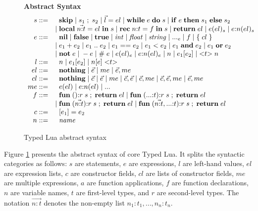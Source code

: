 \begin{figure}[!ht]
\textbf{Abstract Syntax}\\
\dstart
$$
\begin{array}{rl}
s ::= & \;\; \mathbf{skip} \; | \;
s_{1} \; ; \; s_{2} \; | \;
\vec{l} = el \; | \;
\mathbf{while} \; e \; \mathbf{do} \; s \; | \;
\mathbf{if} \; e \; \mathbf{then} \; s_{1} \; \mathbf{else} \; s_{2}\\
& | \; \mathbf{local} \; \vec{n{:}t} = el \; \mathbf{in} \; s \; | \;
\mathbf{rec} \; n{:}t = f \; \mathbf{in} \; s \; | \;
\mathbf{return} \; el \; | \;
e(el)_{s} \; | \;
e{:}n(el)_{s}\\
e ::= & \;\; \mathbf{nil} \; | \;
\mathbf{false} \; | \;
\mathbf{true} \; | \;
{\it int} \; | \;
{\it float} \; | \;
{\it string} \; | \;
{...}_{e} \; | \;
f \; | \;
\{ \; cl \; \} \\
& | \; e_{1} + e_{2} \; | \;
e_{1} \; {..} \; e_{2} \; | \;
e_{1} == e_{2} \; | \;
e_{1} < e_{2} \; | \;
e_{1} \; \mathbf{and} \; e_{2} \; | \;
e_{1} \; \mathbf{or} \; e_{2} \\
& | \; \mathbf{not} \; e \; | \;
- e \; | \;
\# \; e \; | \;
e(el)_{e} \; | \;
e{:}n(el)_{e} \; | \;
n \; | \;
e_{1}[e_{2}] \; | \;
{<}t{>} \; n\\
l ::= & \;\; n \; | \;
e_{1}[e_{2}] \; | \;
n[e] \; {<}t{>}\\
el ::= & \;\; \mathbf{nothing} \; | \;
\vec{e} \; | \;
me \; | \;
\vec{e}, me\\
cl ::= & \;\; \mathbf{nothing} \; | \;
\vec{c} \; | \;
\vec{e} \; | \;
me \; | \;
\vec{c}, \vec{e} \; | \;
\vec{c}, me \; | \;
\vec{c}, \vec{e}, me \; | \;
\vec{e}, me\\
me ::= & \;\; e(el) \; | \;
e{:}n(el) \; | \;
{...}\\
f ::= & \;\; \mathbf{fun} \; (){:}r \; s \; ; \; \mathbf{return} \; el \; | \;
\mathbf{fun} \; ({...}{:}t){:}r \; s \; ; \; \mathbf{return} \; el\\
& | \; \mathbf{fun} \; (\vec{n{:}t}){:}r \; s \; ; \; \mathbf{return} \; el \; | \;
\mathbf{fun} \; (\vec{n{:}t},{...}{:}t){:}r \; s \; ; \; \mathbf{return} \; el\\
c ::= & \;\; [e_{1}] = e_{2}\\
n ::= & \;\; {\it name}\\
\end{array}
$$
\dend
\caption{Typed Lua abstract syntax}
\label{fig:syntax}
\end{figure}

Figure \ref{fig:syntax} presents the abstract syntax of core Typed Lua.
It splits the syntactic categories as follows:
$s$ are statements, $e$ are expressions, $l$ are left-hand values,
$el$ are expression lists, $c$ are constructor fields, $cl$ are lists of
constructor fields, $me$ are multiple expressions, $a$ are function
applications, $f$ are function declarations, $n$ are variable names,
$t$ are first-level types, and $r$ are second-level types.
The notation $\vec{n{:}t}$ denotes the non-empty list
$n_{1}{:}t_{1}, ..., n_{n}{:}t_{n}$.

